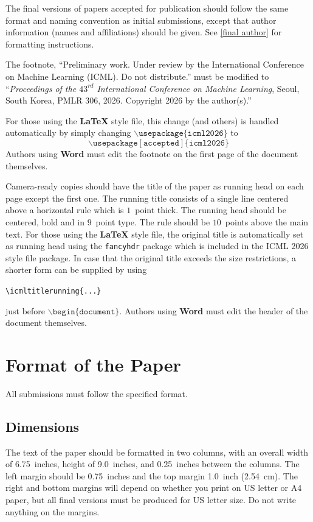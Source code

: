 \documentclass{article}
\theoremstyle{plain}
\theoremstyle{definition}
\theoremstyle{remark}
\begin{document}
The final versions of papers accepted for publication should follow the
same format and naming convention as initial submissions, except that
author information (names and affiliations) should be given. See
\cref{final author} for formatting instructions.

The footnote, ``Preliminary work. Under review by the International
Conference on Machine Learning (ICML). Do not distribute.'' must be
modified to ``\textit{Proceedings of the
  $\mathit{43}^{rd}$ International Conference on Machine Learning},
Seoul, South Korea, PMLR 306, 2026.
Copyright 2026 by the author(s).''

For those using the \textbf{\LaTeX} style file, this change (and others) is
handled automatically by simply changing
$\mathtt{\backslash usepackage\{icml2026\}}$ to
$$\mathtt{\backslash usepackage[accepted]\{icml2026\}}$$
Authors using \textbf{Word} must edit the
footnote on the first page of the document themselves.

Camera-ready copies should have the title of the paper as running head
on each page except the first one. The running title consists of a
single line centered above a horizontal rule which is $1$~point thick.
The running head should be centered, bold and in $9$~point type. The
rule should be $10$~points above the main text. For those using the
\textbf{\LaTeX} style file, the original title is automatically set as running
head using the \texttt{fancyhdr} package which is included in the ICML
2026 style file package. In case that the original title exceeds the
size restrictions, a shorter form can be supplied by using

\verb|\icmltitlerunning{...}|

just before $\mathtt{\backslash begin\{document\}}$.
Authors using \textbf{Word} must edit the header of the document themselves.

\section{Format of the Paper}

All submissions must follow the specified format.

\subsection{Dimensions}

The text of the paper should be formatted in two columns, with an
overall width of 6.75~inches, height of 9.0~inches, and 0.25~inches
between the columns. The left margin should be 0.75~inches and the top
margin 1.0~inch (2.54~cm). The right and bottom margins will depend on
whether you print on US letter or A4 paper, but all final versions
must be produced for US letter size.
Do not write anything on the margins.
\end{document}
